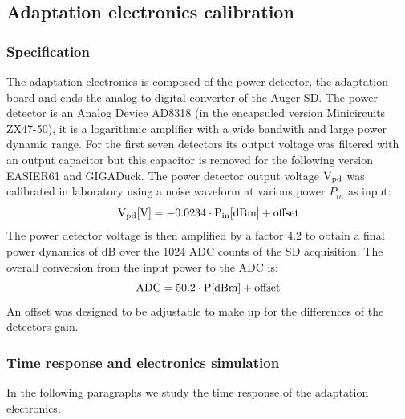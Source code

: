 \subsection{Adaptation electronics calibration}
\label{sec:elec}
\subsubsection{Specification}
The adaptation electronics is composed of the power detector, the adaptation board and ends the analog to digital converter of the Auger SD.  The power detector is an Analog Device AD8318 (in the encapsuled version Minicircuits ZX47-50), it is  a logarithmic  amplifier with a  wide bandwith and  large power
dynamic  range.  For the first seven detectors its output  voltage  was  filtered  with  an  output capacitor  but this capacitor is removed for  the  following version   EASIER61  and  GIGADuck.  The power detector output voltage $\rm V_{pd}$ was calibrated in laboratory using a noise waveform at various power $P_{in}$ as input:
\begin{equation}
  \rm  V_{pd} [V] =  -0.0234\cdot P_{in} [dBm] + offset
\label{eq:eqpd}
\end{equation}
 The  power detector  voltage is  then amplified  by a  factor  4.2 to
 obtain  a final  power dynamics  of \unit[20]{dB}  over the  1024 ADC
 counts of the  SD acquisition. The overall conversion  from the input
 power to the ADC is:
\begin{equation}
  \rm ADC = 50.2\cdot P [dBm] + offset
\label{eq:eqcalibration}
\end{equation}
An offset was designed to be adjustable to make up for the differences of the detectors gain.

\subsubsection{Time response and electronics simulation}
In  the  following  paragraphs  we  study the  time  response  of  the
adaptation  electronics. 
